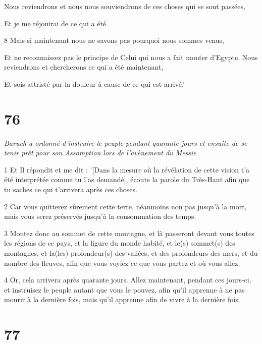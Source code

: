 \par Nous reviendrons et nous nous souviendrons de ces choses qui se sont passées,

\par Et je me réjouirai de ce qui a été.

\par 8 Mais si maintenant nous ne savons pas pourquoi nous sommes venus,

\par Et ne reconnaissez pas le principe de Celui qui nous a fait monter d'Egypte. Nous reviendrons et chercherons ce qui a été maintenant,

\par Et sois attristé par la douleur à cause de ce qui est arrivé.'

\chapter{76}

\par \textit{Baruch a ordonné d'instruire le peuple pendant quarante jours et ensuite de se tenir prêt pour son Assomption lors de l'avènement du Messie}

\par 1 Et Il répondit et me dit : '[Dans la mesure où la révélation de cette vision t'a été interprétée comme tu l'as demandé], écoute la parole du Très-Haut afin que tu saches ce qui t'arrivera après ces choses.

\par 2 Car vous quitterez sûrement cette terre, néanmoins non pas jusqu'à la mort, mais vous serez préservés jusqu'à la consommation des temps.

\par 3 Montez donc au sommet de cette montagne, et là passeront devant vous toutes les régions de ce pays, et la figure du monde habité, et le(s) sommet(s) des montagnes, et la(les) profondeur(s) des vallées, et des profondeurs des mers, et du nombre des fleuves, afin que vous voyiez ce que vous partez et où vous allez.

\par 4 Or, cela arrivera après quarante jours. Allez maintenant, pendant ces jours-ci, et instruisez le peuple autant que vous le pouvez, afin qu'il apprenne à ne pas mourir à la dernière fois, mais qu'il apprenne afin de vivre à la dernière fois.

\chapter{77}

